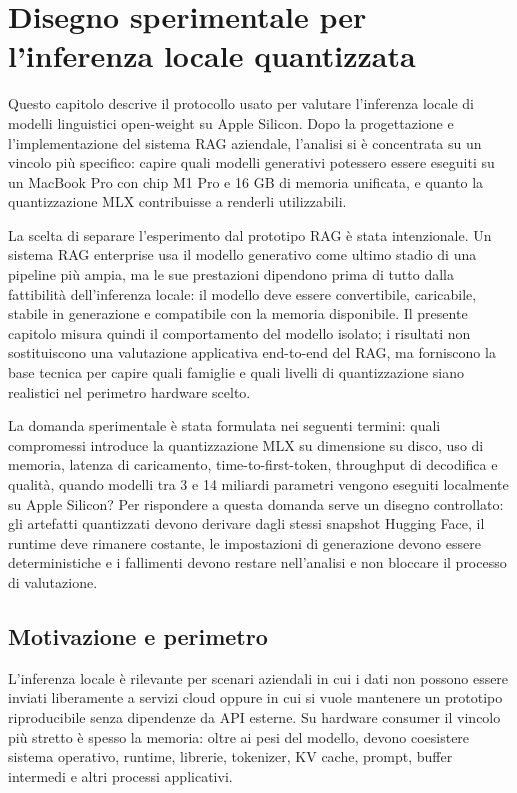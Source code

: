 \pagestyle{mystyle}
\chapter{Disegno sperimentale per l'inferenza locale quantizzata}
\label{chap:ottimizzazione}

Questo capitolo descrive il protocollo usato per valutare l'inferenza locale
di modelli linguistici open-weight su Apple Silicon. Dopo la progettazione e
l'implementazione del sistema RAG aziendale, l'analisi si è concentrata su un
vincolo più specifico: capire quali modelli generativi potessero essere eseguiti
su un MacBook Pro con chip M1 Pro e 16 GB di memoria unificata, e quanto la
quantizzazione MLX contribuisse a renderli utilizzabili.

La scelta di separare l'esperimento dal prototipo RAG è stata intenzionale. Un
sistema RAG enterprise usa il modello generativo come ultimo stadio di una
pipeline più ampia, ma le sue prestazioni dipendono prima di tutto dalla
fattibilità dell'inferenza locale: il modello deve essere convertibile,
caricabile, stabile in generazione e compatibile con la memoria disponibile. Il
presente capitolo misura quindi il comportamento del modello isolato; i risultati
non sostituiscono una valutazione applicativa end-to-end del RAG, ma forniscono
la base tecnica per capire quali famiglie e quali livelli di quantizzazione siano
realistici nel perimetro hardware scelto.

La domanda sperimentale è stata formulata nei seguenti termini: quali
compromessi introduce la quantizzazione MLX su dimensione su disco, uso di
memoria, latenza di caricamento, time-to-first-token, throughput di decodifica e
qualità, quando modelli tra 3 e 14 miliardi parametri vengono eseguiti localmente su
Apple Silicon? Per rispondere a questa domanda serve un disegno
controllato: gli artefatti quantizzati devono derivare dagli stessi snapshot
Hugging Face, il runtime deve rimanere costante, le impostazioni di generazione
devono essere deterministiche e i fallimenti devono restare nell'analisi e non bloccare il processo di valutazione.

\section{Motivazione e perimetro}
\label{sec:experimental_motivation_scope}

L'inferenza locale è rilevante per scenari aziendali in cui i dati non possono
essere inviati liberamente a servizi cloud oppure in cui si vuole mantenere un
prototipo riproducibile senza dipendenze da API esterne.
Su hardware consumer il vincolo più stretto è spesso la memoria: oltre ai pesi del
modello, devono coesistere sistema operativo, runtime, librerie,
tokenizer, KV cache, prompt, buffer intermedi e altri processi applicativi.

